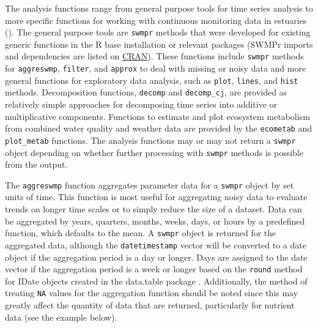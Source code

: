 \documentclass[10pt,letterpaper]{article}\usepackage[]{graphicx}\usepackage[]{color}
\begin{document}
The analysis functions range from general purpose tools for time series analysis to more specific functions for working with continuous monitoring data in estuaries ().  The general purpose tools are \texttt{swmpr} methods that were developed for existing generic functions in the R base installation or relevant packages (SWMPr imports and dependencies are listed on \href{http://cran.r-project.org/web/packages/SWMPr/index.html}{CRAN}). These functions include \texttt{swmpr} methods for \texttt{aggreswmp}, \texttt{filter}, and \texttt{approx} to deal with missing or noisy data and more general functions for exploratory data analysis, such as \texttt{plot}, \texttt{lines}, and \texttt{hist} methods.  Decomposition functions, \texttt{decomp} and \texttt{decomp\_cj}, are provided as relatively simple approaches for decomposing time series into additive or multiplicative components. Functions to estimate and plot ecosystem metabolism from combined water quality and weather data are provided by the \texttt{ecometab} and \texttt{plot\_metab} functions.  The analysis functions may or may not return a \texttt{swmpr} object depending on whether further processing with \texttt{swmpr} methods is possible from the output.    

The \texttt{aggreswmp} function aggregates parameter data for a \texttt{swmpr} object by set units of time.  This function is most useful for aggregating noisy data to evaluate trends on longer time scales or to simply reduce the size of a dataset.  Data can be aggregated by years, quarters, months, weeks, days, or hours by a predefined function, which defaults to the mean.  A \texttt{swmpr} object is returned for the aggregated data, although the \texttt{datetimestamp} vector will be converted to a date object if the aggregation period is a day or longer.  Days are assigned to the date vector if the aggregation period is a week or longer based on the \texttt{round} method for IDate objects created in the data.table package \cite{Dowle14}.  Additionally, the method of treating \texttt{NA} values for the aggregation function should be noted since this may greatly affect the quantity of data that are returned, particularly for nutrient data (see the example below).
\end{document}
